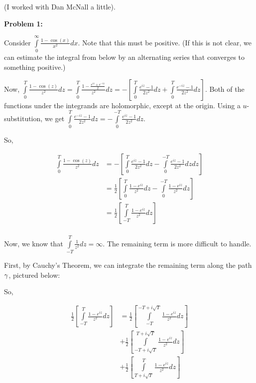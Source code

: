\documentclass[a4paper,12pt]{article}
\begin{document}
(I worked with Dan McNall a little).

{\bf Problem 1:}

Consider $\int\limits_0^\infty \frac{1-\cos(x)}{x^2} dx$. Note that this must be positive. (If this is not clear, we can estimate the integral from below by an alternating series that converges to something positive.)

Now, $\int\limits_0^T\frac{1-\cos(z)}{z^2} dz = \int\limits_0^T\frac{1-\frac{e^{iz}+e^{-iz}}{2}}{z^2} dz = -\left[\int\limits_0^T \frac{e^{iz}-1}{2z^2} dz+ \int\limits_0^T \frac{e^{-iz}-1}{2z^2} dz\right]$. Both of the functions under the integrands are holomorphic, except at the origin. Using a $u$-substitution, we get $\int\limits_0^T \frac{e^{-iz}-1}{2z^2} dz = -\int\limits_0^{-T} \frac{e^{iz}-1}{2z^2} dz$.

So, 

\begin{align*}
\int\limits_0^T\frac{1-\cos(z)}{z^2} dz &= -\left[\int\limits_0^T \frac{e^{iz}-1}{2z^2} dz- \int\limits_0^{-T} \frac{e^{iz}-1}{2z^2} dz dz\right]\\
&= \frac{1}{2}\left[\int\limits_0^T \frac{1-e^{iz}}{z^2} dz-\int\limits_0^{-T} \frac{1-e^{iz}}{z^2} dz \right]\\
&= \frac{1}{2}\left[\int\limits_{-T}^T \frac{1-e^{iz}}{z^2} dz \right]\\
\end{align*} %

Now, we know that $\int\limits_{-T}^T \frac{1}{z^2} dz = \infty$. The remaining term is more difficult to handle.

First, by Cauchy's Theorem, we can integrate the remaining term along the path $\gamma$, pictured below:

\shunt %

So, 

\begin{align*}
\frac{1}{2}\left[\int\limits_{-T}^T \frac{1-e^{iz}}{z^2} dz \right] &= \frac{1}{2}\left[\int\limits_{-T}^{-T+i\sqrt{T}} \frac{1-e^{iz}}{z^2} dz \right]\\
&+ \frac{1}{2}\left[\int\limits_{-T+i\sqrt{T}}^{T+i\sqrt{T}} \frac{1-e^{iz}}{z^2} dz \right]\\
&+ \frac{1}{2}\left[\int\limits_{T+i\sqrt{T}}^T \frac{1-e^{iz}}{z^2} dz \right]
\end{align*} %
\end{document}
